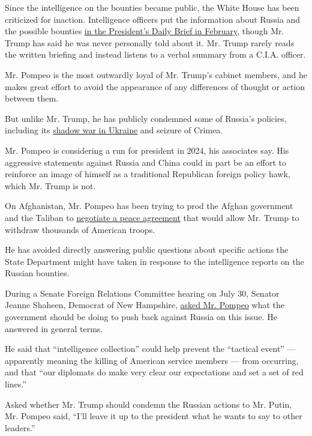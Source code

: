 Since the intelligence on the bounties became public, the White House
has been criticized for inaction. Intelligence officers put the
information about Russia and the possible bounties
\href{https://www.nytimes3xbfgragh.onion/2020/06/29/us/politics/russian-bounty-trump.html}{in
the President's Daily Brief in February}, though Mr. Trump has said he
was never personally told about it. Mr. Trump rarely reads the written
briefing and instead listens to a verbal summary from a C.I.A. officer.

Mr. Pompeo is the most outwardly loyal of Mr. Trump's cabinet members,
and he makes great effort to avoid the appearance of any differences of
thought or action between them.

But unlike Mr. Trump, he has publicly condemned some of Russia's
policies, including its
\href{https://www.nytimes3xbfgragh.onion/2020/01/31/world/europe/ukraine-pompeo-zelensky-trump.html}{shadow
war in Ukraine} and seizure of Crimea.

Mr. Pompeo is considering a run for president in 2024, his associates
say. His aggressive statements against Russia and China could in part be
an effort to reinforce an image of himself as a traditional Republican
foreign policy hawk, which Mr. Trump is not.

On Afghanistan, Mr. Pompeo has been trying to prod the Afghan government
and the Taliban to
\href{https://www.nytimes3xbfgragh.onion/2020/07/28/world/asia/afghanistan-cease-fire-taliban.html}{negotiate
a peace agreement} that would allow Mr. Trump to withdraw thousands of
American troops.

He has avoided directly answering public questions about specific
actions the State Department might have taken in response to the
intelligence reports on the Russian bounties.

During a Senate Foreign Relations Committee hearing on July 30, Senator
Jeanne Shaheen, Democrat of New Hampshire,
\href{https://www.youtube.com/watch?v=7TeOLjqd5x8\&feature=youtu.be}{asked
Mr. Pompeo} what the government should be doing to push back against
Russia on this issue. He answered in general terms.

He said that ``intelligence collection'' could help prevent the
``tactical event'' --- apparently meaning the killing of American
service members --- from occurring, and that ``our diplomats do make
very clear our expectations and set a set of red lines.''

Asked whether Mr. Trump should condemn the Russian actions to Mr. Putin,
Mr. Pompeo said, ``I'll leave it up to the president what he wants to
say to other leaders.''

